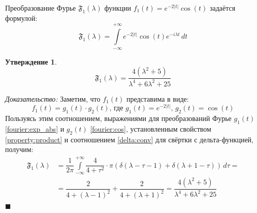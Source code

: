 \documentclass[11pt, oneside, final]{article} \sloppy
\numberwithin{equation}{section}
\newtheorem*{statement}{Утверждение}
\renewenvironment{proof}{
\noindent\textit{Доказательство: }} {\qed}
\newcommand \intinf[1][{\,dt}]{ \int\limits_{-\infty}^{+\infty}{{#1}}}
\renewcommand \qed{$\blacksquare$}
\begin{document}
Преобразование Фурье \( \mathfrak{F_1} (\lambda)\) функции \(f_1(t) = e^{-2|t|} \cos(t) \) задаётся формулой:
\[ \mathfrak{F_1} (\lambda) = \intinf[{e^{-2|t|} \cos(t) e^{-i\lambda t}\, dt}] \]
\begin{statement}
    \begin{equation}\label{fourier_transform:f1} 
        \boxed{ \mathfrak{F_1}(\lambda) = \dfrac{4(\lambda^2 + 5)}{\lambda^4 + 6\lambda^2 + 25} } 
    \end{equation}
\end{statement}
\begin{proof}
    Заметим, что \(f_1(t) \) представима в виде: 
    \begin{equation}\label{factor:f1} 
        f_1(t) = g_1(t) \cdot g_2(t) \text{, где }g_1(t) = e^{-2|t|},\,g_2(t) = \cos(t) 
    \end{equation}
    Пользуясь этим соотношением, выражениями для преобразований Фурье \(g_1(t)\) \eqref{fourier:exp_abs} и \(g_2(t)\) \eqref{fourier:cos}, установленным свойством \ref{property:product} и соотношением \eqref{delta:conv} для свёртки с дельта-функцией, получим:
    \[ 
    \begin{split}
        \mathfrak{F_1} (\lambda) &= \dfrac{1}{2\pi} \intinf[{\dfrac{4}{4 + \tau^2} \cdot \pi(\delta(\lambda - \tau- 1) + \delta(\lambda + 1 - \tau))\,d\tau}] = \\
        &=\dfrac{2}{4 + (\lambda - 1)^2} + \dfrac{2}{4 + (\lambda + 1)^2} = \dfrac{4(\lambda^2 + 5)}{\lambda^4 + 6\lambda^2 + 25} 
    \end{split}
    \]
\end{proof}

\end{document}
